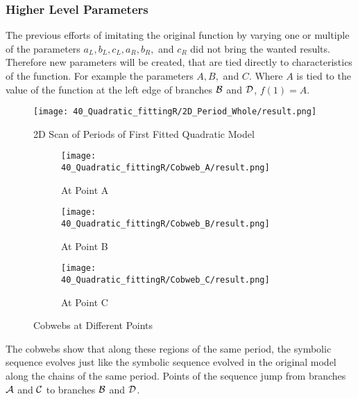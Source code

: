 \subsubsection{Higher Level Parameters}

The previous efforts of imitating the original function by varying one or multiple of the parameters $a_L, b_L, c_L, a_R, b_R,$ and $c_R$ did not bring the wanted results.
Therefore new parameters will be created, that are tied directly to characteristics of the function.
For example the parameters $A, B,$ and $C$.
Where $A$ is tied to the value of the function at the left edge of branches $\mathcal{B}$ and $\mathcal{D}$, $f(1) = A$.



\begin{figure}
    \centering
    \texttt{[image: 40\_Quadratic\_fittingR/2D\_Period\_Whole/result.png]}
    \caption{2D Scan of Periods of First Fitted Quadratic Model}
    \label{fig:quadratic.full.fit.1.Period}
\end{figure}


\begin{figure}
    \centering
    \begin{subfigure}{0.3\textwidth}
        \centering
        \texttt{[image: 40\_Quadratic\_fittingR/Cobweb\_A/result.png]}
        \caption{At Point A}
        \label{fig:quad.full.fit.1.CobwebA}
    \end{subfigure}
    \begin{subfigure}{0.3\textwidth}
        \centering
        \texttt{[image: 40\_Quadratic\_fittingR/Cobweb\_B/result.png]}
        \caption{At Point B}
        \label{fig:quad.full.fit.1.CobwebB}
    \end{subfigure}
    \begin{subfigure}{0.3\textwidth}
        \centering
        \texttt{[image: 40\_Quadratic\_fittingR/Cobweb\_C/result.png]}
        \caption{At Point C}
        \label{fig:quad.full.fit.1.CobwebC}
    \end{subfigure}
    \caption{Cobwebs at Different Points}
    \label{fig:quad.full.fit.1.Cobwebs}
\end{figure}

The cobwebs show that along these regions of the same period, the symbolic sequence evolves just like the symbolic sequence evolved in the original model along the chains of the same period.
Points of the sequence jump from branches $\mathcal{A}$ and $\mathcal{C}$ to branches $\mathcal{B}$ and $\mathcal{D}$.

